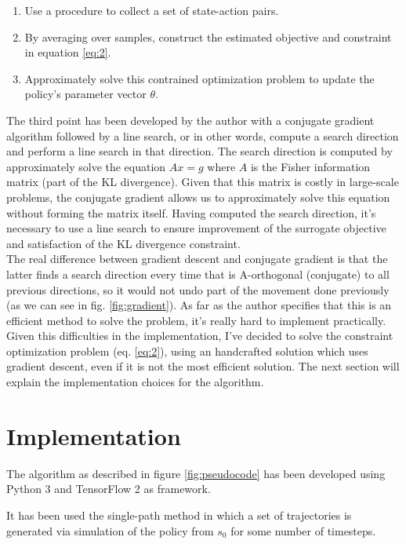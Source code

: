 \documentclass[11pt]{article}
\begin{document}
\begin{enumerate}
        \item Use a procedure to collect a set of state-action pairs.
        \item By averaging over samples, construct the estimated objective and constraint
        in equation \ref{eq:2}.
        \item Approximately solve this contrained optimization problem to update the
        policy's parameter vector $\theta$.

\end{enumerate}
The third point has been developed by the author with a conjugate gradient algorithm followed
by a line search, or in other words, compute a search direction and perform a line search
in that direction. The search direction is computed by approximately solve the equation
$Ax = g$ where $A$ is the Fisher information matrix (part of the KL divergence). Given
that this matrix is costly in large-scale problems, the conjugate gradient allows us to
approximately solve this equation without forming the matrix itself. Having computed the
search direction, it's necessary to use a line search to ensure
improvement of the surrogate objective and satisfaction of the KL divergence constraint.
\\
The real difference between gradient descent and conjugate gradient is that the
latter finds a search direction every time that is A-orthogonal (conjugate) to all previous
directions, so it would not undo part of the movement done previously (as we can see in fig. \ref{fig:gradient}).
As far as the author specifies that this is an efficient method to solve the problem, it's
really hard to implement practically. Given this difficulties in the implementation, I've
decided to solve the constraint optimization problem (eq. \ref{eq:2}), using an
handcrafted solution which uses gradient descent, even if it is not the most efficient
solution. 
The next section will explain the implementation choices for the algorithm.
\section{Implementation}
The algorithm as described in figure \ref{fig:pseudocode} has been developed using Python
3 and TensorFlow 2 as framework.

It has been used the single-path method in which a set of trajectories is generated via
simulation of the policy from $s_0$ for some number of timesteps.
\end{document}

